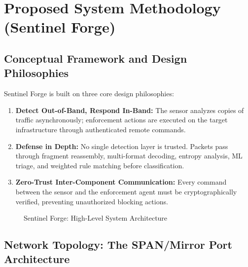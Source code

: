 \chapter{Proposed System Methodology (Sentinel Forge)}

\section{Conceptual Framework and Design Philosophies}

Sentinel Forge is built on three core design philosophies:

\begin{enumerate}
    \item \textbf{Detect Out-of-Band, Respond In-Band:} The sensor analyzes copies of traffic asynchronously; enforcement actions are executed on the target infrastructure through authenticated remote commands.
    
    \item \textbf{Defense in Depth:} No single detection layer is trusted. Packets pass through fragment reassembly, multi-format decoding, entropy analysis, ML triage, and weighted rule matching before classification.
    
    \item \textbf{Zero-Trust Inter-Component Communication:} Every command between the sensor and the enforcement agent must be cryptographically verified, preventing unauthorized blocking actions.
\end{enumerate}

\begin{figure}[h]
\centering
{}
\caption{Sentinel Forge: High-Level System Architecture}
\label{fig:system_architecture}
\end{figure}

\section{Network Topology: The SPAN/Mirror Port Architecture}

